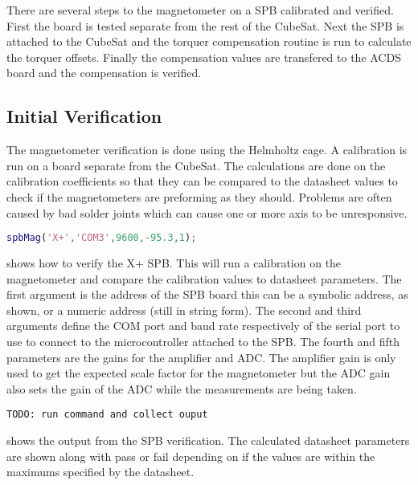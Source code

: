 There are several steps to the magnetometer on a \ac{SPB} calibrated and verified. First the board is tested separate from the rest of the CubeSat. Next the \ac{SPB} is attached to the CubeSat and the torquer compensation routine is run to calculate the torquer offsets. Finally the compensation values are transfered to the \ac{ACDS} board and the compensation is verified.


\subsection{Initial Verification}

The magnetometer verification is done using the Helmholtz cage. A calibration is run on a board separate from the CubeSat. The calculations are done on the calibration coefficients so that they can be compared to the datasheet values to check if the magnetometers are preforming as they should. Problems are often caused by bad solder joints which can cause one or more axis to be unresponsive.

\begin{lstlisting}[style=code,caption={\ac{SPB} verification},label={lst:vspb},language=Matlab]
spbMag('X+','COM3',9600,-95.3,1);
\end{lstlisting}

 shows how to verify the X+ \ac{SPB}. This will run a calibration on the magnetometer and compare the calibration values to datasheet parameters. The first argument is the address of the \ac{SPB} board this can be a symbolic address, as shown, or a numeric address (still in string form). The second and third arguments define the COM port and baud rate respectively of the serial port to use to connect to the microcontroller attached to the \ac{SPB}. The fourth and fifth parameters are the gains for the amplifier and \ac{ADC}. The amplifier gain is only used to get the expected scale factor for the magnetometer but the \ac{ADC} gain also sets the gain of the \ac{ADC} while the measurements are being taken.

\begin{lstlisting}[caption={\ac{SPB} verification results},label={lst:vspb-res},language=verbatim]
TODO: run command and collect ouput
\end{lstlisting}

 shows the output from the \ac{SPB} verification. The calculated datasheet parameters are shown along with pass or fail depending on if the values are within the maximums specified by the datasheet.


